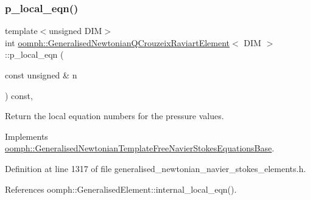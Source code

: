 \mbox{\label{classoomph_1_1GeneralisedNewtonianQCrouzeixRaviartElement_ade39fac0866f29d4e87fefd567fc33f9}} 
\subsubsection{\texorpdfstring{p\+\_\+local\+\_\+eqn()}{p\_local\_eqn()}}
{\footnotesize\ttfamily template$<$unsigned D\+IM$>$ \\
int \hyperlink{classoomph_1_1GeneralisedNewtonianQCrouzeixRaviartElement}{oomph\+::\+Generalised\+Newtonian\+Q\+Crouzeix\+Raviart\+Element}$<$ D\+IM $>$\+::p\+\_\+local\+\_\+eqn (\begin{DoxyParamCaption}\item[{const unsigned \&}]{n }\end{DoxyParamCaption}) const\hspace{0.3cm}{\ttfamily [inline]}, {\ttfamily [virtual]}}



Return the local equation numbers for the pressure values. 



Implements \hyperlink{classoomph_1_1GeneralisedNewtonianTemplateFreeNavierStokesEquationsBase_abacdc7add36a8da0b68b9f991e7973d9}{oomph\+::\+Generalised\+Newtonian\+Template\+Free\+Navier\+Stokes\+Equations\+Base}.



Definition at line 1317 of file generalised\+\_\+newtonian\+\_\+navier\+\_\+stokes\+\_\+elements.\+h.



References oomph\+::\+Generalised\+Element\+::internal\+\_\+local\+\_\+eqn().

\mbox{\label{classoomph_1_1GeneralisedNewtonianQCrouzeixRaviartElement_aa4293ea7acc0f6bc4cd9e7fe2248b726}} 

